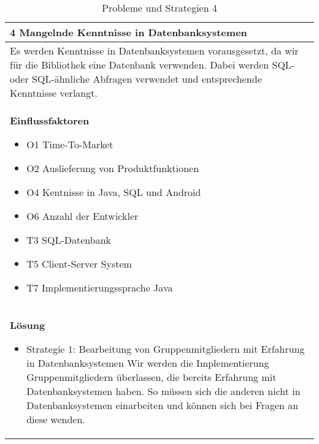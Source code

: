 \begin{table}[H]
\caption{Probleme und Strategien 4}
\begin{tabular}{|p{\textwidth}|}\hline
4 Mangelnde Kenntnisse in Datenbanksystemen\\ \hline
Es werden Kenntnisse in Datenbanksystemen vorausgesetzt, da wir für die Bibliothek eine Datenbank verwenden. Dabei werden SQL- oder SQL-ähnliche Abfragen verwendet und entsprechende Kenntnisse verlangt. \\ \hline
\textbf{Einflussfaktoren}
\begin{itemize}
\item O1 Time-To-Market
\item O2 Auslieferung von Produktfunktionen
\item O4 Kentnisse in Java, SQL und Android
\item O6 Anzahl der Entwickler
\item T3 SQL-Datenbank
\item T5 Client-Server System
\item T7 Implementierungssprache Java
\end{itemize}\\ \hline
\textbf{Lösung}
\begin{itemize}
\item Strategie 1: Bearbeitung von Gruppenmitgliedern mit Erfahrung in Datenbanksystemen \leavevmode\newline
Wir werden die Implementierung Gruppenmitgliedern überlassen, die bereits Erfahrung mit Datenbanksystemen haben. So müssen sich die anderen nicht in Datenbanksystemen einarbeiten und können sich bei Fragen an diese wenden.
\end{itemize}\\ \hline
\end{tabular}
\end{table}

